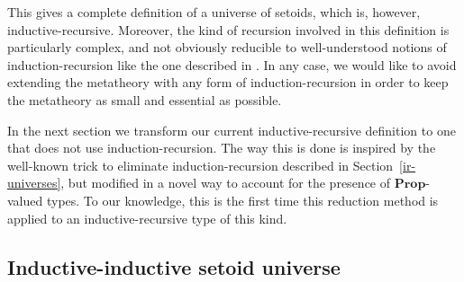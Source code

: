 \documentclass[autoref]{llncs}
\newcommand{\mProp}{\mathbf{Prop}}
\begin{document}
This gives a complete definition of a universe of setoids, which is, however,
inductive-recursive. Moreover, the kind of recursion involved in this definition
is particularly complex, and not obviously reducible to well-understood notions
of induction-recursion like the one described in \cite{dybjer-setzer}. In any
case, we would like to avoid extending the metatheory with any form of
induction-recursion in order to keep the metatheory as small and
essential as possible.

In the next section we transform our current inductive-recursive definition to
one that does not use induction-recursion.
%
The way this is done is inspired by the well-known trick to eliminate
induction-recursion described in Section~\ref{ir-universes}, but modified in a
novel way to account for the presence of $\mProp$-valued types. To our
knowledge, this is the first time this reduction method is applied to an
inductive-recursive type of this kind.

\subsection{Inductive-inductive setoid universe}\label{ii-universe}
\end{document}
